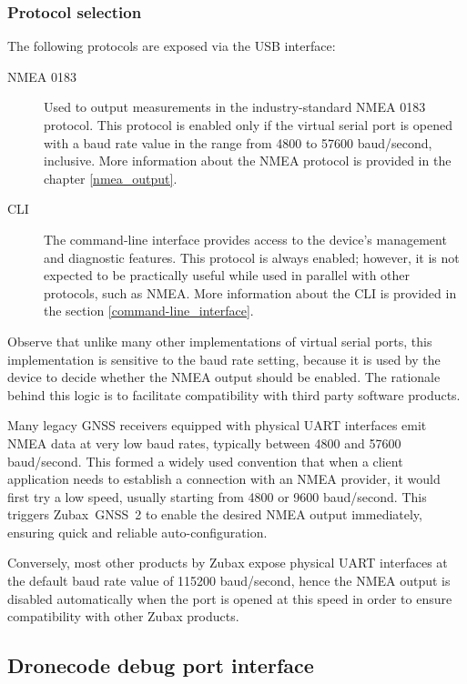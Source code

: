 \documentclass{zubaxdoc}
\begin{document}
\subsubsection{Protocol selection}\label{sec:usb_protocol_selection}

The following protocols are exposed via the USB interface:
\begin{description}

    \item[NMEA 0183] Used to output measurements in the industry-standard NMEA 0183 protocol.
    This protocol is enabled only if the virtual serial port is opened with a baud rate value in the
    range from 4800 to 57600 baud/second, inclusive.
    More information about the NMEA protocol is provided in the chapter \ref{nmea_output}.

    \item[CLI] The command-line interface provides access to the device's management and diagnostic
    features. This protocol is always enabled; however, it is not expected to be practically useful
    while used in parallel with other protocols, such as NMEA.
    More information about the CLI is provided in the section \ref{command-line_interface}.

\end{description}

Observe that unlike many other implementations of virtual serial ports,
this implementation is sensitive to the baud rate setting,
because it is used by the device to decide whether the NMEA output should be enabled.
The rationale behind this logic is to facilitate compatibility with third party software products.

Many legacy GNSS receivers equipped with physical UART interfaces emit NMEA data at very low
baud rates, typically between 4800 and 57600 baud/second.
This formed a widely used convention that when a client application needs to establish a connection
with an NMEA provider, it would first try a low speed, usually starting from 4800 or 9600
baud/second.
This triggers Zubax~GNSS~2 to enable the desired NMEA output immediately,
ensuring quick and reliable auto-configuration.

Conversely, most other products by Zubax expose physical UART interfaces at the default baud rate
value of 115200 baud/second, hence the NMEA output is disabled automatically when the port is opened at
this speed in order to ensure compatibility with other Zubax products.

\subsection{Dronecode debug port interface}
\end{document}

